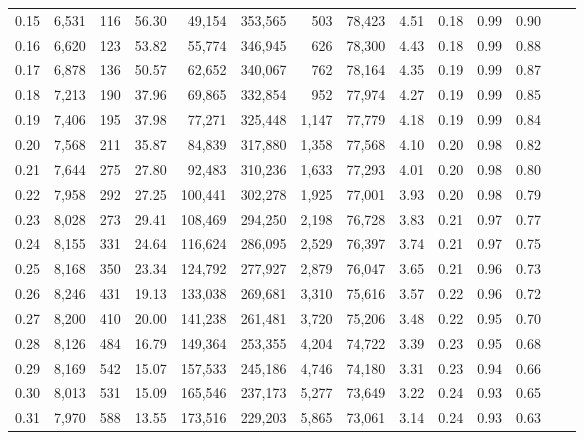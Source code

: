 \begin{tabular}{rrrrrrrrrrrrrr}
0.15 &  6,531 &    116 &    56.30 &   49,154 &  353,565 &     503 &  78,423 &  4.51 &  0.18 &  0.99 &      0.90 \\
0.16 &  6,620 &    123 &    53.82 &   55,774 &  346,945 &     626 &  78,300 &  4.43 &  0.18 &  0.99 &      0.88 \\
0.17 &  6,878 &    136 &    50.57 &   62,652 &  340,067 &     762 &  78,164 &  4.35 &  0.19 &  0.99 &      0.87 \\
0.18 &  7,213 &    190 &    37.96 &   69,865 &  332,854 &     952 &  77,974 &  4.27 &  0.19 &  0.99 &      0.85 \\
0.19 &  7,406 &    195 &    37.98 &   77,271 &  325,448 &   1,147 &  77,779 &  4.18 &  0.19 &  0.99 &      0.84 \\
0.20 &  7,568 &    211 &    35.87 &   84,839 &  317,880 &   1,358 &  77,568 &  4.10 &  0.20 &  0.98 &      0.82 \\
0.21 &  7,644 &    275 &    27.80 &   92,483 &  310,236 &   1,633 &  77,293 &  4.01 &  0.20 &  0.98 &      0.80 \\
0.22 &  7,958 &    292 &    27.25 &  100,441 &  302,278 &   1,925 &  77,001 &  3.93 &  0.20 &  0.98 &      0.79 \\
0.23 &  8,028 &    273 &    29.41 &  108,469 &  294,250 &   2,198 &  76,728 &  3.83 &  0.21 &  0.97 &      0.77 \\
0.24 &  8,155 &    331 &    24.64 &  116,624 &  286,095 &   2,529 &  76,397 &  3.74 &  0.21 &  0.97 &      0.75 \\
0.25 &  8,168 &    350 &    23.34 &  124,792 &  277,927 &   2,879 &  76,047 &  3.65 &  0.21 &  0.96 &      0.73 \\
0.26 &  8,246 &    431 &    19.13 &  133,038 &  269,681 &   3,310 &  75,616 &  3.57 &  0.22 &  0.96 &      0.72 \\
0.27 &  8,200 &    410 &    20.00 &  141,238 &  261,481 &   3,720 &  75,206 &  3.48 &  0.22 &  0.95 &      0.70 \\
0.28 &  8,126 &    484 &    16.79 &  149,364 &  253,355 &   4,204 &  74,722 &  3.39 &  0.23 &  0.95 &      0.68 \\
0.29 &  8,169 &    542 &    15.07 &  157,533 &  245,186 &   4,746 &  74,180 &  3.31 &  0.23 &  0.94 &      0.66 \\
0.30 &  8,013 &    531 &    15.09 &  165,546 &  237,173 &   5,277 &  73,649 &  3.22 &  0.24 &  0.93 &      0.65 \\
0.31 &  7,970 &    588 &    13.55 &  173,516 &  229,203 &   5,865 &  73,061 &  3.14 &  0.24 &  0.93 &      0.63 \\

\end{tabular}
